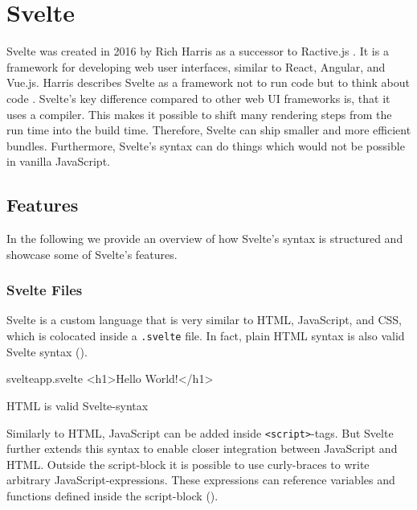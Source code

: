 \section{Svelte}
\label{sec:svelte}

Svelte was created in 2016 by Rich Harris as a successor to Ractive.js \cite{offerzen_origins_svelte_2022}. It is a framework for developing web user interfaces, similar to React, Angular, and Vue.js. Harris describes Svelte as a framework not to run code but to think about code \cite{offerzen_origins_svelte_2022}. Svelte's key difference compared to other web UI frameworks is, that it uses a compiler. This makes it possible to shift many rendering steps from the run time into the build time. Therefore, Svelte can ship smaller and more efficient bundles. Furthermore, Svelte's syntax can do things which would not be possible in vanilla JavaScript.

\subsection{Features}

In the following we provide an overview of how Svelte's syntax is structured and showcase some of Svelte's features.

\subsubsection{Svelte Files}

Svelte is a custom language that is very similar to HTML, JavaScript, and CSS, which is colocated inside a \texttt{.svelte} file. In fact, plain HTML syntax is also valid Svelte syntax ().

\begin{listing}[h!]
\begin{myminted}{svelte}{app.svelte}
<h1>Hello World!</h1>
\end{myminted}
\caption{HTML is valid Svelte-syntax}
\label{fig:svelte-basic-html}
\end{listing}

Similarly to HTML, JavaScript can be added inside \texttt{<script>}-tags. But Svelte further extends this syntax to enable closer integration between JavaScript and HTML. Outside the script-block it is possible to use curly-braces to write arbitrary JavaScript-expressions. These expressions can reference variables and functions defined inside the script-block ().

